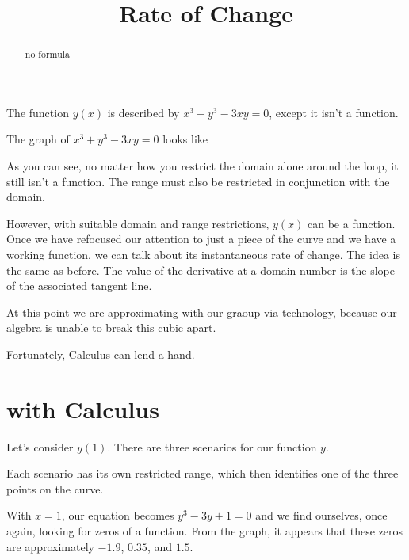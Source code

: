 \documentclass{ximera}
\title{Rate of Change}
\begin{document}
\begin{abstract}
no formula
\end{abstract}
\maketitle




The function $y(x)$ is described by $x^3 + y^3 - 3 x y = 0$, except it isn't a function.



The graph of $x^3 + y^3 - 3 x y = 0$ looks like




\begin{center}
\end{center}


As you can see, no matter how you restrict the domain alone around the loop, it still isn't a function. The range must also be restricted in conjunction with the domain.

However, with suitable domain and range restrictions, $y(x)$ can be a function. \\


Once we have refocused our attention to just a piece of the curve and we have a working function, we can talk about its instantaneous rate of change.  The idea is the same as before.  The value of the derivative at a domain number is the slope of the associated tangent line.


At this point we are approximating with our graoup via technology, because our algebra is unable to break this cubic apart.



Fortunately, Calculus can lend a hand.




\section{with Calculus}

Let's consider $y(1)$.  There are three scenarios for our function $y$.


\begin{center}
\end{center}

Each scenario has its own restricted range, which then identifies one of the three points on the curve.



With $x=1$, our equation becomes $y^3 - 3 y + 1 = 0$ and we find ourselves, once again, looking for zeros of a function. From the graph, it appears that these zeros are approximately $-1.9$, $0.35$, and $1.5$.
\end{document}
